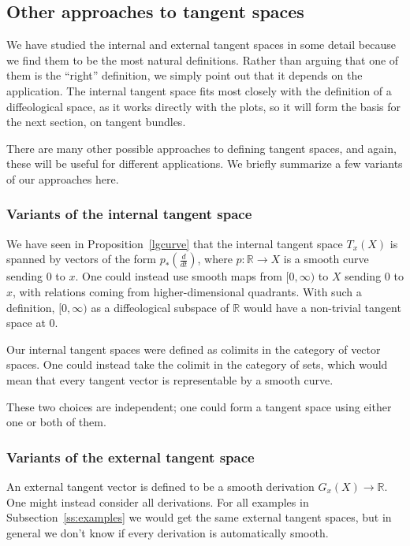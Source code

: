 \documentclass[12pt]{amsart}
\theoremstyle{remark}
\def \R{\mathbb{R}}
\begin{document}
%

%
%
%
%
%
%
%
%

\subsection{Other approaches to tangent spaces}\label{ss:other-approaches}

We have studied the internal and external tangent spaces in some detail
because we find them to be the most natural definitions.
Rather than arguing that one of them is the ``right'' definition, we
simply point out that it depends on the application.
The internal tangent space fits most closely with the definition of a
diffeological space, as it works directly with the plots, so it will
form the basis for the next section, on tangent bundles.
%
%
%
%
%
%
%
%
%
%
%

There are many other possible approaches to defining tangent spaces,
and again, these will be useful for different applications.
We briefly summarize a few variants of our approaches here.

\subsubsection{Variants of the internal tangent space}

We have seen in Proposition~\ref{lgcurve} that the internal tangent space
$T_x(X)$ is spanned by vectors of the form $p_*(\frac{d}{dt})$,
where $p : \R \to X$ is a smooth curve sending $0$ to $x$.
One could instead use smooth maps from $[0, \infty)$ to $X$ sending
$0$ to $x$, with relations coming from higher-dimensional quadrants.
With such a definition, $[0, \infty)$ as a diffeological subspace of $\R$
would have a non-trivial tangent space at $0$.

Our internal tangent spaces were defined as colimits in the category of vector spaces.
One could instead take the colimit in the category of sets, which would mean
that every tangent vector is representable by a smooth curve.
%
%
%

These two choices are independent;  one could form a tangent space
using either one or both of them.

\subsubsection{Variants of the external tangent space}

An external tangent vector is defined to be a smooth derivation $G_x(X) \to \R$.
One might instead consider all derivations.
For all examples in Subsection~\ref{ss:examples} we would get the same external tangent spaces,
but in general we don't know if every derivation is automatically smooth.
\end{document}
